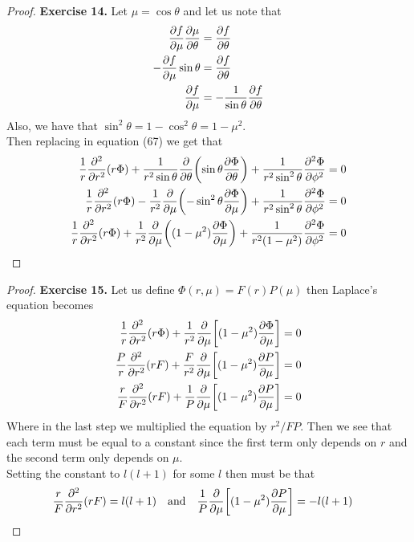 \documentclass[11pt]{article}
\theoremstyle{definition}
\begin{document}
\cleardoublepage
\begin{proof}{\textbf{Exercise 14.}}
Let $\mu = \cos\theta$ and let us note that
\begin{align*}
    \pdv{f}{\mu}\pdv{\mu}{\theta} &= \pdv{f}{\theta}\\
    -\pdv{f}{\mu}\sin\theta &= \pdv{f}{\theta}\\
    \pdv{f}{\mu} &= -\frac{1}{\sin\theta}\pdv{f}{\theta}
\end{align*}
Also, we have that $\sin^2\theta = 1 - \cos^2\theta = 1 - \mu^2$.\\
Then replacing in equation (67) we get that
\begin{align*}
    \frac{1}{r}\pdv[2]{r}(r\Phi)
    + \frac{1}{r^2\sin\theta}\pdv{\theta}(\sin\theta\pdv{\Phi}{\theta})
    + \frac{1}{r^2\sin^2\theta}\pdv[2]{\Phi}{\phi} &= 0\\
    \frac{1}{r}\pdv[2]{r}(r\Phi)
    - \frac{1}{r^2}\pdv{\mu}(-\sin^2\theta\pdv{\Phi}{\mu})
    + \frac{1}{r^2\sin^2\theta}\pdv[2]{\Phi}{\phi} &= 0\\
    \frac{1}{r}\pdv[2]{r}(r\Phi)
    + \frac{1}{r^2}\pdv{\mu}((1 - \mu^2)\pdv{\Phi}{\mu})
    + \frac{1}{r^2(1 - \mu^2)}\pdv[2]{\Phi}{\phi} &= 0
\end{align*}
\end{proof}

\begin{proof}{\textbf{Exercise 15.}}
Let us define $\Phi(r, \mu) = F(r)P(\mu)$ then Laplace's equation becomes
\begin{align*}
    \frac{1}{r}\pdv[2]{r}(r\Phi)
    + \frac{1}{r^2}\pdv{\mu}\bigg[(1 - \mu^2)\pdv{\Phi}{\mu}\bigg]&= 0\\
    \frac{P}{r}\pdv[2]{r}(rF)
    + \frac{F}{r^2}\pdv{\mu}\bigg[(1 - \mu^2)\pdv{P}{\mu}\bigg]&= 0\\
    \frac{r}{F}\pdv[2]{r}(rF)
    + \frac{1}{P}\pdv{\mu}\bigg[(1 - \mu^2)\pdv{P}{\mu}\bigg]&= 0
\end{align*}
Where in the last step we multiplied the equation by $r^2/FP$. Then we see that
each term must be equal to a constant since the first term only depends on $r$
and the second term only depends on $\mu$.
\\
Setting the constant to $l(l + 1)$ for some $l$ then must be that
\begin{align*}
    \frac{r}{F}\pdv[2]{r}(rF) &= l(l + 1) \quad\text{and}\quad
    \frac{1}{P}\pdv{\mu}\bigg[(1 - \mu^2)\pdv{P}{\mu}\bigg] = -l(l + 1)
\end{align*}
\end{proof}
\end{document}
